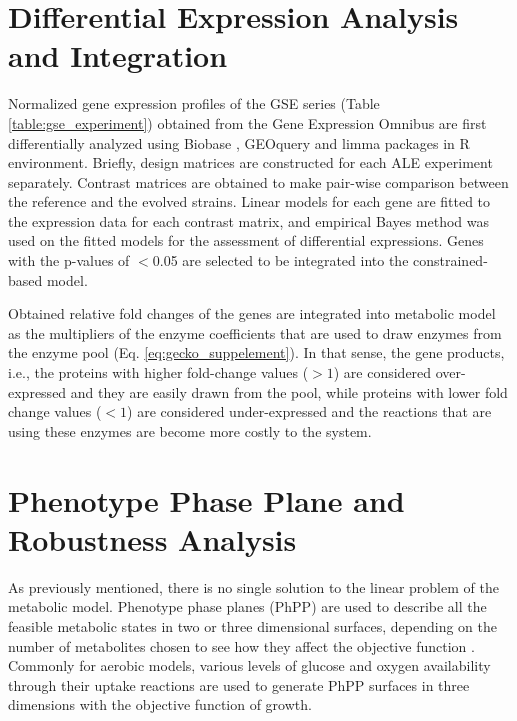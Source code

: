 \section{Differential Expression Analysis and Integration}
Normalized gene expression profiles of the GSE series (Table \ref{table:gse_experiment}) obtained from the Gene Expression Omnibus are first differentially analyzed using Biobase \cite{huber2015orchestrating}, GEOquery \cite{davis2007geoquery} and limma \cite{ritchie2015limma} packages in R environment. Briefly, design matrices are constructed for each ALE experiment separately. Contrast matrices are obtained to make pair-wise comparison between the reference and the evolved strains. Linear models for each gene are fitted to the expression data for each contrast matrix, and empirical Bayes method was used on the fitted models for the assessment of differential expressions. Genes with the p-values of $<$0.05 are selected to be integrated into the constrained-based model.



Obtained relative fold changes of the genes are integrated into metabolic model as the multipliers of the enzyme coefficients that are used to draw enzymes from the enzyme pool (Eq. \ref{eq:gecko_suppelement}). In that sense, the gene products, i.e., the proteins with higher fold-change values ($>1$) are considered over-expressed and they are easily drawn from the pool, while proteins with lower fold change values ($<1$) are considered under-expressed and the reactions that are using these enzymes are become more costly to the system.



\section{Phenotype Phase Plane and Robustness Analysis}

As previously mentioned, there is no single solution to the linear problem of the metabolic model. Phenotype phase planes (PhPP) are used to describe all the feasible metabolic states in two or three dimensional surfaces, depending on the number of metabolites chosen to see how they affect the objective function \cite{edwards2002characterizing}. Commonly for aerobic models, various levels of glucose and oxygen availability through their uptake reactions are used to generate PhPP surfaces in three dimensions with the objective function of growth.

